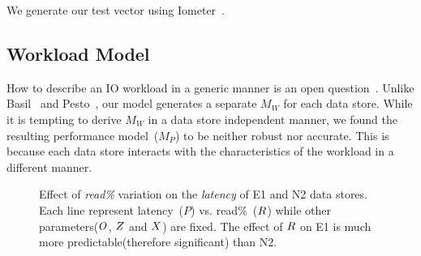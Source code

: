 We generate our test vector using Iometer~\cite{sievert:2004}.

\subsection{Workload Model}
How to describe an IO workload in a generic manner is an open question~\cite{liu:2008, wang:2004, kavalanekar:2008, tarasov:2012}.
Unlike Basil~\cite{gulati:2010} and Pesto~\cite{gulati:2011}, our model generates a separate $M_W$ for each data store.
While it is tempting to derive $M_W$ in a data store independent manner, we found the resulting performance model~($M_P$) to be neither robust nor accurate.
This is because each data store interacts with the characteristics of the workload in a different manner.
\begin{figure}[!t]
\centering
{}
\captionsetup{format=myformat}
\caption{Effect of \emph{read\%} variation on the \emph{latency} of E1 and N2 data stores.
Each line represent latency~($P$) vs. read\%~($R$) while other parameters($O$, $Z$ and $X$) are fixed.
The effect of $R$ on E1 is much more predictable(therefore significant) than N2.
}
\label{readParam}
\end{figure}
